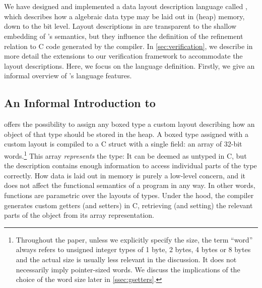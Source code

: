 \section{\Dargent}{\label{sec:dargent}}

We have designed and implemented a data layout description language called \dargent,
which describes how a \cogent algebraic data type may be laid
out in (heap) memory, down to the bit level. Layout descriptions in \dargent are transparent to
the shallow embedding of \cogent's semantics, but they
influence the definition of the refinement relation to C code
generated by the compiler. In \autoref{sec:verification}, we describe in more
detail the extensions to our verification framework to accommodate
the \dargent layout descriptions. Here, we focus on the language
definition. Firstly, we give an informal overview of \dargent's language features.

\subsection{An Informal Introduction to \dargent} \label{ssec:informal-intro}

\Dargent offers the possibility to assign any boxed \cogent type a
custom layout describing how an object of that type should be stored in
the heap.
%
A boxed type
assigned with a custom layout is compiled to a C struct with a single
field: an array of 32-bit words.\footnote{Throughout the paper, unless
we explicitly specify the size, the term
``word'' always refers to unsigned integer types of 1 byte, 2 bytes,
4 bytes or 8 bytes and the actual size is usually less relevant in
the discussion. It does not necessarily imply pointer-sized words.
We discuss the implications
of the choice of the word size later in \autoref{ssec:gsetters}. 
}
This array \emph{represents} the
\cogent type: It can be deemed as untyped in C, but the \dargent description
contains enough information to access individual parts of the type correctly.
How data is laid out in memory is purely a low-level concern, and it does not
affect the functional semantics of a \cogent program in any way.
In other words, \cogent functions are parametric over the layouts of types.
%
Under the hood, the \cogent compiler generates custom getters (and
setters) in C, retrieving (and setting) the relevant parts of the object
from its array representation.

